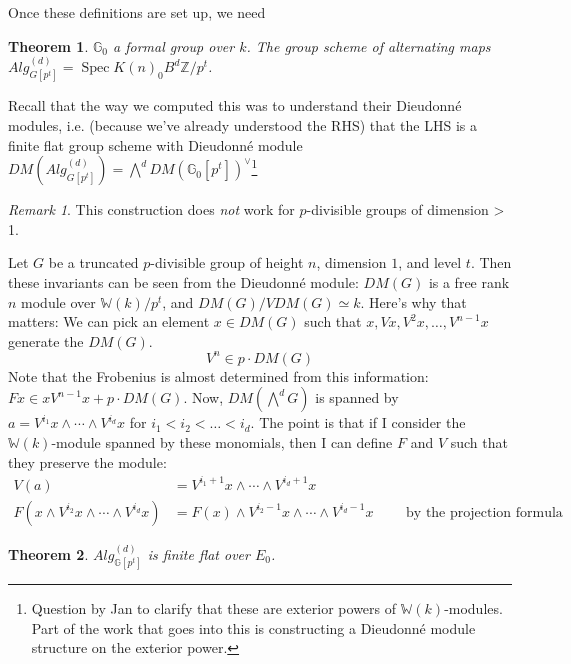 \documentclass{article}
\newcommand{\Z}{{\mathbb{Z}}}
\newcommand{\W}{{\mathbb{W}}}
\renewcommand{\G}{{\mathbb{G}}}
\DeclareMathOperator{\Spec}{Spec}
\theoremstyle{definition} \newtheorem*{defn}{Definition}
\theoremstyle{plain} \newtheorem*{prop}{Proposition}
\theoremstyle{plain} \newtheorem*{lemma}{Lemma}
\theoremstyle{plain} \newtheorem*{cor}{Corollary}
\theoremstyle{remark} \newtheorem*{ex}{Example}
\theoremstyle{remark} \newtheorem*{exs}{Examples}
\theoremstyle{remark} \newtheorem*{nonex}{Non-example}
\theoremstyle{remark} \newtheorem*{rmk}{Remark}
\theoremstyle{remark} \newtheorem*{exc}{Exercise}
\theoremstyle{remark} \newtheorem*{idea}{Idea}
\theoremstyle{remark} \newtheorem*{obs}{Observation}
\theoremstyle{plain} \newtheorem*{theorem}{Theorem}
\theoremstyle{plain} \newtheorem*{conj}{Conjecture}
\theoremstyle{remark} \newtheorem*{q}{Question}
\theoremstyle{definition} \newtheorem*{fact}{Fact}
\theoremstyle{definition} \newtheorem*{facts}{Facts}
\theoremstyle{remark} \newtheorem*{ntn}{Notation}
\theoremstyle{remark} \newtheorem*{goal}{Goal}
\theoremstyle{remark} \newtheorem*{sketch}{Sketch}
\theoremstyle{definition} \newtheorem{claim}{Claim}
\begin{document}
Once these definitions are set up, we need
 \begin{theorem}
	$ \G_0 $ a formal group over $ k $. 
	The group scheme of alternating maps $ Alg^{(d)}_{G[p^t]} = \Spec K(n)_0 B^d \Z/p^t $. 
\end{theorem} 
Recall that the way we computed this was to understand their Dieudonn\'e modules, i.e. (because we've already understood the RHS) that the LHS is a finite flat group scheme with Dieudonn\'e module $ DM(Alg^{(d)}_{G[p^t]}) = \bigwedge^d DM(\G_0[p^t])^\vee $\footnote{Question by Jan to clarify that these are exterior powers of $ \W(k) $-modules. Part of the work that goes into this is constructing a Dieudonn\'e module structure on the exterior power.}
\begin{rmk}
	This construction does \emph{not} work for $ p $-divisible groups of dimension > 1. 
\end{rmk}
Let $ G $ be a truncated $ p $-divisible group of height $ n $, dimension $ 1 $, and level  $ t $. 
Then these invariants can be seen from the Dieudonn\'e module: $ DM(G) $ is a free rank $ n $ module over $ \W(k)/p^t $, and $ DM(G)/VDM(G) \simeq k $. 
Here's why that matters: We can pick an element $ x \in DM(G) $ such that $ x, Vx, V^2x, \ldots, V^{n-1}x $ generate the $ DM(G) $. 
$$ V^n \in p \cdot DM(G) $$
Note that the Frobenius is almost determined from this information: $ Fx \in x V^{n-1} x + p \cdot DM(G) $. 
Now, $ DM(\bigwedge^d G) $ is spanned by $ a = V^{i_1} x \wedge \cdots \wedge V^{i_d}x $ for $ i_1 < i_2 < \ldots < i_d $. 
The point is that if I consider the $ \W(k) $-module spanned by these monomials, then I can define $ F $ and $ V $ such that they preserve the module:
\begin{align*}
	V(a) &= V^{i_1 + 1}x \wedge \cdots \wedge V^{i_d + 1}x \\
	F(x \wedge V^{i_2} x \wedge \cdots \wedge V^{i_d}x ) &= F(x) \wedge V^{i_2 -1} x \wedge \cdots \wedge V^{i_d-1}x \qquad \text{ by the projection formula}
\end{align*}

\begin{theorem}
	$ Alg^{(d)}_{\G[p^t]} $ is finite flat over $ E_0 $. 
\end{theorem}

\begin{comment}
\begin{equation}
\begin{tikzcd}
	& 
\end{tikzcd}
\end{equation}
\end{comment}
\end{document}
